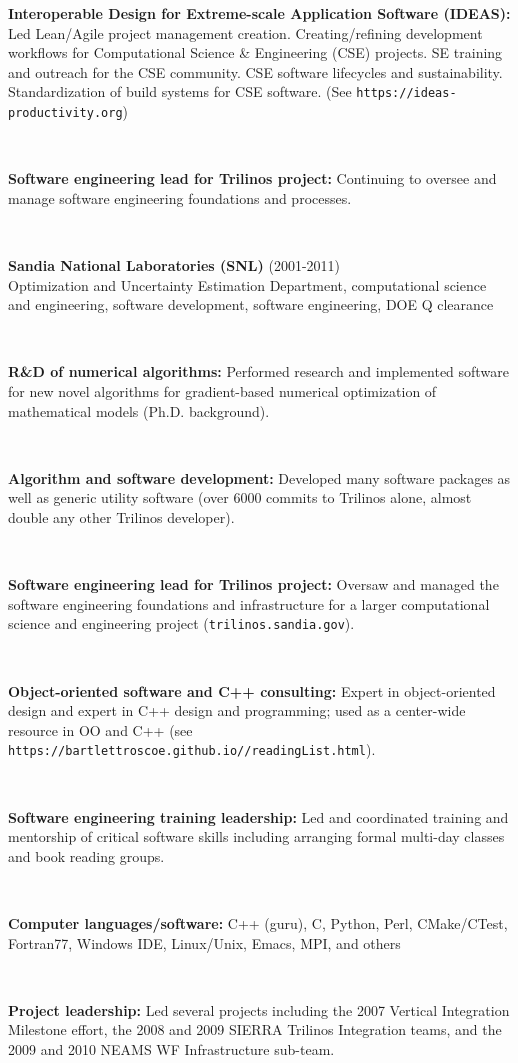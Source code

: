\documentclass{report}
\newcommand{\itemvs}{1ex}
\newcommand{\indentone}{0.5in}
\newcommand{\widthone}{6.4in}
\newcommand{\pboxone}{\hspace*{\indentone}\parbox[t]{\widthone}}
\newcommand{\indenttwo}{0.75in}
\newcommand{\widthtwo}{6.15in}
\newcommand{\pboxtwo}{\hspace*{\indenttwo}\parbox[t]{\widthtwo}}
\begin{document}
%
{}\pboxtwo{\textbf{Interoperable Design for Extreme-scale Application Software (IDEAS):} Led Lean/Agile project management creation. Creating/refining development workflows for Computational Science \& Engineering (CSE) projects. SE training and outreach for the CSE community. CSE software lifecycles and sustainability.  Standardization of build systems for CSE software.  (See \texttt{https://ideas-productivity.org})}
\\[\itemvs]
%
{}\pboxtwo{\textbf{Software engineering lead for Trilinos project:} Continuing to oversee and manage software engineering foundations and processes.}
\\[\itemvs]
%
{}\pboxone{\textbf{Sandia National Laboratories (SNL)} (2001-2011)\\
Optimization and Uncertainty Estimation Department, computational science and engineering, software development, software engineering, DOE Q clearance} \\[\itemvs]
%
{}\pboxtwo{\textbf{R\&D of numerical algorithms:} Performed research and implemented software for new novel algorithms for gradient-based numerical optimization of mathematical models (Ph.D. background).} \\[\itemvs]
%
{}\pboxtwo{\textbf{Algorithm and software development:} Developed many software packages as well as generic utility software (over 6000 commits to Trilinos alone, almost double any other Trilinos developer).} \\[\itemvs]
%
{}\pboxtwo{\textbf{Software engineering lead for Trilinos project:} Oversaw and managed the software engineering foundations and infrastructure for a larger computational science and engineering project (\texttt{trilinos.sandia.gov}).} \\[\itemvs]
%
{}\pboxtwo{\textbf{Object-oriented software and C++ consulting:} Expert in object-oriented design and expert in C++ design and programming; used as a center-wide resource in OO and C++ (see {}\texttt{https://bartlettroscoe.github.io//readingList.html}).} \\[\itemvs]
%
{}\pboxtwo{\textbf{Software engineering training leadership:} Led and coordinated training and mentorship of critical software skills including arranging formal multi-day classes and book reading groups.} \\[\itemvs]
%
{}\pboxtwo{\textbf{Computer languages/software:} C++ (guru), C, Python, Perl, CMake/CTest, Fortran77, Windows IDE, Linux/Unix, Emacs, MPI, and others} \\[\itemvs]
%
{}\pboxtwo{\textbf{Project leadership:} Led several projects including the 2007 Vertical Integration Milestone effort, the 2008 and 2009 SIERRA Trilinos Integration teams, and the 2009 and 2010 NEAMS WF Infrastructure sub-team.} \\[\itemvs]
\end{document}
